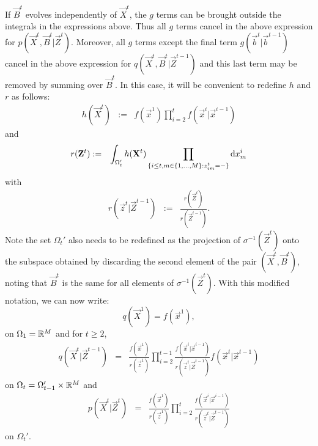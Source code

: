 If $\vec{B}^t$ evolves independently of $\vec{X}^t$, the $g$ terms can be brought outside the integrals in the expressions above. Thus all $g$ terms cancel in the above expression for $p(\vec{X}^t, \vec{B}^t | \vec{Z}^t)$. Moreover, all $g$ terms except the final term $g(\vec{b}^t | \vec{b}^{t-1})$ cancel in the above expression for $q(\vec{X}^t, \vec{B}^t | \vec{Z}^{t-1})$ and this last term may be removed by summing over $\vec{B}^t$. In this case, it will be convenient to redefine $h$ and $r$ as follows:
\begin{eqnarray*}
h(\vec{X}^t) & := & f(\vec{x}^1)\prod_{i=2}^{t} f(\vec{x}^i | \vec{x}^{i-1})
\end{eqnarray*}
and
\begin{eqnarray*}
r(\mathbf{Z}^t) & := & \int_{\Omega_t'}  h(\mathbf{X}^t) \prod_{ \{ i \leq t, m \in \{1, \ldots, M \} : z^t_{im} = - \} } \mathrm{d} x^i_m
\end{eqnarray*}
with
\begin{eqnarray*}
r(\vec{z}^t | \vec{Z}^{t-1}) & := & \frac{r(\vec{Z}^t)}{r(\vec{Z}^{t-1})}.
\end{eqnarray*}
Note the set $\Omega_t'$ also needs to be redefined as the projection of $\sigma^{-1}(\vec{Z}^t)$ onto the subspace obtained by discarding the second element of the pair $(\vec{X}^t,\vec{B}^t)$, noting that $\vec{B}^t$ is the same for all elements of $\sigma^{-1}(\vec{Z}^t)$. With this modified notation, we can now write:
\[
q(\vec{X}^1) = f(\vec{x}^1),
\]
on $\Omega_1 = \mathbb R^M$ and for $t \geq 2$,
\begin{eqnarray*}
    q(\vec{X}^t | \vec{Z}^{t-1}) & = & \frac{f(\vec{x}^1)}{r(\vec{z}^1)}  \prod_{i=2}^{t-1} \frac{f(\vec{x}^i | \vec{x}^{i-1}) }{r(\vec{z}^t | \vec{Z}^{t-1})} f(\vec{x}^t | \vec{x}^{t-1})
\end{eqnarray*}
on $\Omega_t = \Omega_{t-1}' \times \mathbb R^M $ and 
\begin{eqnarray*}
    p(\vec{X}^t | \vec{Z}^t) 
& = & \frac{f(\vec{x}^1)}{r(\vec{z}^1)} \prod_{i=2}^t \frac{f(\vec{x}^i | \vec{x}^{i-1}) }{r(\vec{z}^t | \vec{Z}^{t-1})} 
\end{eqnarray*}
on $\Omega_t'$.



